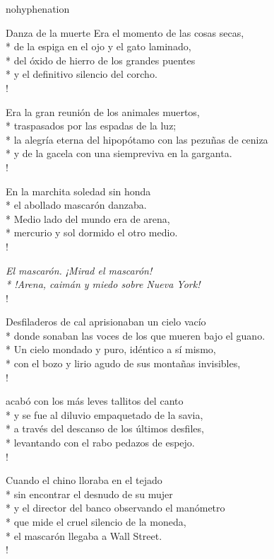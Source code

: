 \documentclass[
    a5paper,
    DIV=10,
    12pt,
    notitlepage,
    oneside,]
{scrbook} %
\begin{document}
\begin{hyphenrules}{nohyphenation}
\begin{poem}{Danza de la muerte}{}{\vspace{-1em}}
Era el momento de las cosas secas,\\*
de la espiga en el ojo y el gato laminado,\\*
del óxido de hierro de los grandes puentes\\*
y el definitivo silencio del corcho.\\!

Era la gran reunión de los animales muertos,\\*
traspasados por las espadas de la luz;\\*
la alegría eterna del hipopótamo con las pezuñas de ceniza\\*
y de la gacela con una siempreviva en la garganta.\\!

En la marchita soledad sin honda\\*
el abollado mascarón danzaba.\\*
Medio lado del mundo era de arena,\\*
mercurio y sol dormido el otro medio.\\!

\emph{El mascarón. ¡Mirad el mascarón!\\*
!Arena, caimán y miedo sobre Nueva York!} \\!

Desfiladeros de cal aprisionaban un cielo vacío\\*
donde sonaban las voces de los que mueren bajo el guano.\\*
Un cielo mondado y puro, idéntico a sí mismo,\\*
con el bozo y lirio agudo de sus montañas invisibles, \\!

acabó con los más leves tallitos del canto\\*
y se fue al diluvio empaquetado de la savia,\\*
a través del descanso de los últimos desfiles,\\*
levantando con el rabo pedazos de espejo.\\!

Cuando el chino lloraba en el tejado\\*
sin encontrar el desnudo de su mujer\\*
y el director del banco observando el manómetro\\*
que mide el cruel silencio de la moneda,\\*
el mascarón llegaba a Wall Street.\\!


\end{poem}
\end{hyphenrules}
\end{document}
